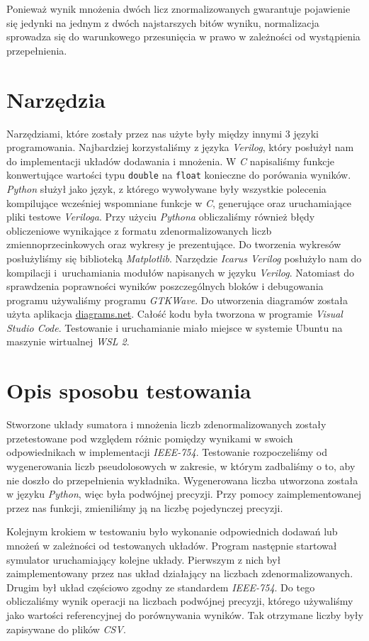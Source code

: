 \documentclass{article}
\begin{document}
Ponieważ wynik mnożenia dwóch licz znormalizowanych gwarantuje pojawienie się jedynki na jednym z dwóch najstarszych bitów wyniku, normalizacja sprowadza się do warunkowego przesunięcia w prawo w zależności od wystąpienia przepełnienia.


\section{Narzędzia}
Narzędziami, które zostały przez nas użyte były między innymi 3 języki programowania.
Najbardziej korzystaliśmy z języka \emph{Verilog}, który posłużył nam do implementacji układów dodawania i mnożenia.
W \emph{C} napisaliśmy funkcje konwertujące wartości typu \texttt{double} na \texttt{float} konieczne do porówania wyników.
\emph{Python} służył jako język, z którego wywoływane były wszystkie polecenia kompilujące wcześniej wspomniane funkcje w \emph{C}, generujące oraz uruchamiające pliki testowe \emph{Veriloga}.
Przy użyciu \emph{Pythona} obliczaliśmy również błędy obliczeniowe wynikające z formatu zdenormalizowanych liczb zmiennoprzecinkowych oraz wykresy je prezentujące.
Do tworzenia wykresów posłużyliśmy się biblioteką \emph{Matplotlib}.
Narzędzie \emph{Icarus Verilog} posłużyło nam do kompilacji i~uruchamiania modułów napisanych w języku \emph{Verilog}.
Natomiast do sprawdzenia poprawności wyników poszczególnych bloków i debugowania programu używaliśmy programu \emph{GTKWave}.
Do utworzenia diagramów została użyta aplikacja \url{diagrams.net}.
Całość kodu była tworzona w programie \emph{Visual Studio Code}.
Testowanie i uruchamianie miało miejsce w systemie Ubuntu na maszynie wirtualnej \emph{WSL 2}.


\section{Opis sposobu testowania}
Stworzone układy sumatora i mnożenia liczb zdenormalizowanych zostały przetestowane pod względem różnic pomiędzy wynikami w swoich odpowiednikach w implementacji \emph{IEEE-754}.
Testowanie rozpoczeliśmy od wygenerowania liczb pseudolosowych w zakresie, w którym zadbaliśmy o to, aby nie doszło do przepełnienia wykładnika.
Wygenerowana liczba utworzona została w języku \emph{Python}, więc była podwójnej precyzji.
Przy pomocy zaimplementowanej przez nas funkcji, zmieniliśmy ją na liczbę pojedynczej precyzji.

Kolejnym krokiem w testowaniu było wykonanie odpowiednich dodawań lub mnożeń w zależności od testowanych układów.
Program następnie startował symulator uruchamiający kolejne układy.
Pierwszym z nich był zaimplementowany przez nas układ działający na liczbach zdenormalizowanych.
Drugim był układ częściowo zgodny ze standardem \emph{IEEE-754}.
Do tego obliczaliśmy wynik operacji na liczbach podwójnej precyzji, którego używaliśmy jako wartości referencyjnej do porównywania wyników.
Tak otrzymane liczby były zapisywane do plików \emph{CSV}.
\end{document}
